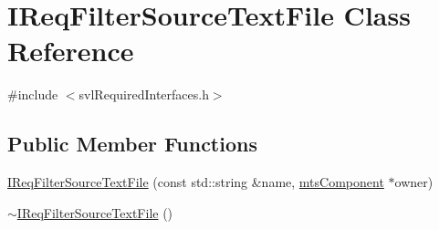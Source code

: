 \hypertarget{class_i_req_filter_source_text_file}{\section{I\-Req\-Filter\-Source\-Text\-File Class Reference}
\label{class_i_req_filter_source_text_file}
}


{\ttfamily \#include $<$svl\-Required\-Interfaces.\-h$>$}

\subsection*{Public Member Functions}
\begin{DoxyCompactItemize}
\item 
\hyperlink{class_i_req_filter_source_text_file_aa51f31b7f57a8af34339781df6f05342}{I\-Req\-Filter\-Source\-Text\-File} (const std\-::string \&name, \hyperlink{classmts_component}{mts\-Component} $\ast$owner)
\item 
\hyperlink{class_i_req_filter_source_text_file_ae7d3cd4c4e8b712432dbfc42eadc6f03}{$\sim$\-I\-Req\-Filter\-Source\-Text\-File} ()
\end{DoxyCompactItemize}
